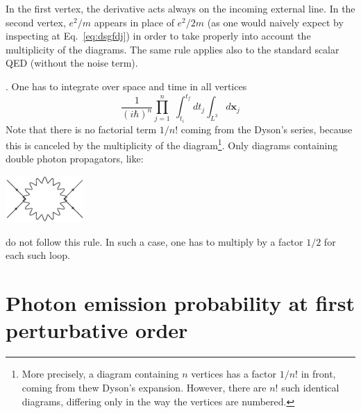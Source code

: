 \documentclass[12pt,onecolumn,amssymb,nofootinbib]{revtex4-2} %
\begin{document}
In the first vertex, the derivative acts always on the incoming external line.
In the second vertex, $e^2/m$ appears in place of $e^2/2m$ (as one would
naively expect by inspecting at Eq.~\eqref{eq:dsgfdj}) in order to take
properly into account the multiplicity of the diagrams. The same rule applies
also to the standard scalar QED (without the noise term).

. One has to integrate over space and time in all vertices
\[
\frac{1}{ (i\hbar)^n } \prod_{j = 1}^{n} \;
\int_{t_{i}}^{t_{f}}dt_{j}\int_{L^3} d\mathbf{x}_{j}
\]
Note that there is no factorial term $1/n!$ coming from the Dyson's series,
because this is canceled by the multiplicity of the diagram\footnote{More
precisely, a diagram containing $n$ vertices has a factor $1/n!$ in front,
coming from thew Dyson's expansion. However, there are $n!$ such identical
diagrams, differing only in the way the vertices are numbered.}. Only diagrams
containing double photon propagators, like:

\begin{center}
{\includegraphics[width=3cm, keepaspectratio]{alone.eps}}
\end{center}

do not follow this rule. In such a case, one has to multiply by a factor $1/2$
for each such loop.



\section{Photon emission probability at first perturbative order}
\end{document}
